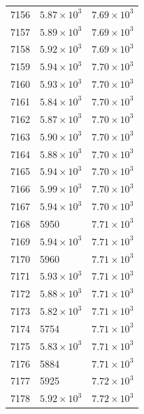 \begin{table}[H]
\begin{tabular}{lll}
7156 & $\displaystyle 5.87 \times 10^{3}$ & $\displaystyle 7.69 \times 10^{3}$ \\
7157 & $\displaystyle 5.89 \times 10^{3}$ & $\displaystyle 7.69 \times 10^{3}$ \\
7158 & $\displaystyle 5.92 \times 10^{3}$ & $\displaystyle 7.69 \times 10^{3}$ \\
7159 & $\displaystyle 5.94 \times 10^{3}$ & $\displaystyle 7.70 \times 10^{3}$ \\
7160 & $\displaystyle 5.93 \times 10^{3}$ & $\displaystyle 7.70 \times 10^{3}$ \\
7161 & $\displaystyle 5.84 \times 10^{3}$ & $\displaystyle 7.70 \times 10^{3}$ \\
7162 & $\displaystyle 5.87 \times 10^{3}$ & $\displaystyle 7.70 \times 10^{3}$ \\
7163 & $\displaystyle 5.90 \times 10^{3}$ & $\displaystyle 7.70 \times 10^{3}$ \\
7164 & $\displaystyle 5.88 \times 10^{3}$ & $\displaystyle 7.70 \times 10^{3}$ \\
7165 & $\displaystyle 5.94 \times 10^{3}$ & $\displaystyle 7.70 \times 10^{3}$ \\
7166 & $\displaystyle 5.99 \times 10^{3}$ & $\displaystyle 7.70 \times 10^{3}$ \\
7167 & $\displaystyle 5.94 \times 10^{3}$ & $\displaystyle 7.70 \times 10^{3}$ \\
7168 & 5950 & $\displaystyle 7.71 \times 10^{3}$ \\
7169 & $\displaystyle 5.94 \times 10^{3}$ & $\displaystyle 7.71 \times 10^{3}$ \\
7170 & 5960 & $\displaystyle 7.71 \times 10^{3}$ \\
7171 & $\displaystyle 5.93 \times 10^{3}$ & $\displaystyle 7.71 \times 10^{3}$ \\
7172 & $\displaystyle 5.88 \times 10^{3}$ & $\displaystyle 7.71 \times 10^{3}$ \\
7173 & $\displaystyle 5.82 \times 10^{3}$ & $\displaystyle 7.71 \times 10^{3}$ \\
7174 & 5754 & $\displaystyle 7.71 \times 10^{3}$ \\
7175 & $\displaystyle 5.83 \times 10^{3}$ & $\displaystyle 7.71 \times 10^{3}$ \\
7176 & 5884 & $\displaystyle 7.71 \times 10^{3}$ \\
7177 & 5925 & $\displaystyle 7.72 \times 10^{3}$ \\
7178 & $\displaystyle 5.92 \times 10^{3}$ & $\displaystyle 7.72 \times 10^{3}$ \\

\end{tabular}
\end{table}
